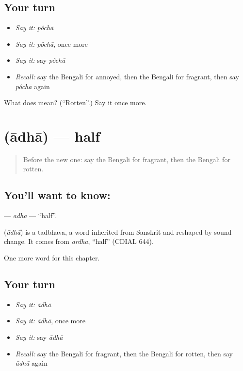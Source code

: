 \subsection*{Your turn}
\begin{itemize}
\raggedright
  \item \emph{Say it:} \emph{pôchā}
  \item \emph{Say it:} \emph{pôchā}, once more
  \item \emph{Say it:} say \emph{pôchā}
  \item \emph{Recall:} say the Bengali for annoyed, then the Bengali for fragrant, then say \emph{pôchā} again
\end{itemize}

\begin{tcolorbox}[breakable,colback=teal!4,colframe=teal!35!black,title={Before you move on}]
What does  mean? (\textquotedblleft{}Rotten\textquotedblright{}.) Say it once more.
\end{tcolorbox}
\section[\texorpdfstring{\bn{আধা} (ādhā)}{আধা (ādhā)}]{ (ādhā) — half}

\label{lesson:BN-C162-adha}



\begin{quote}
Before the new one: say the Bengali for fragrant, then the Bengali for rotten.
\end{quote}

\subsection*{You'll want to know: }
\textbf{} — \emph{ādhā} — \textquotedblleft{}half\textquotedblright{}.

\begin{cousinweb}
\textbf{} (\emph{ādhā}) is a tadbhava, a word inherited from Sanskrit and reshaped by sound change. It comes from \emph{ardha}, \textquotedblleft{}half\textquotedblright{} (CDIAL 644).
\end{cousinweb}

\begin{grammarlens}[title={What you've built}]
One more word for this chapter.
\end{grammarlens}

\subsection*{Your turn}
\begin{itemize}
\raggedright
  \item \emph{Say it:} \emph{ādhā}
  \item \emph{Say it:} \emph{ādhā}, once more
  \item \emph{Say it:} say \emph{ādhā}
  \item \emph{Recall:} say the Bengali for fragrant, then the Bengali for rotten, then say \emph{ādhā} again
\end{itemize}

